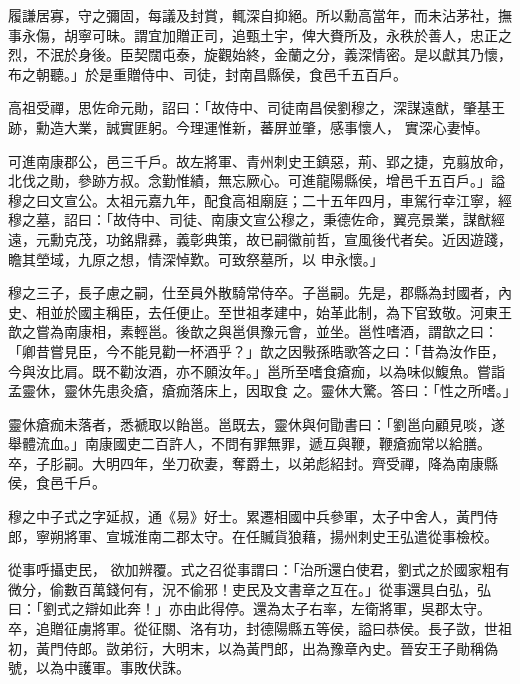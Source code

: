 \begin{pinyinscope}
 履謙居寡，守之彌固，每議及封賞，輒深自抑絕。所以勳高當年，而未沾茅社，撫事永傷，胡寧可昧。謂宜加贈正司，追甄土宇，俾大賚所及，永秩於善人，忠正之烈，不泯於身後。臣契闊屯泰，旋觀始終，金蘭之分，義深情密。是以獻其乃懷，布之朝聽。」於是重贈侍中、司徒，封南昌縣侯，食邑千五百戶。



 高祖受禪，思佐命元勛，詔曰：「故侍中、司徒南昌侯劉穆之，深謀遠猷，肇基王跡，勳造大業，誠實匪躬。今理運惟新，蕃屏並肇，感事懷人，
 實深心妻悼。



 可進南康郡公，邑三千戶。故左將軍、青州刺史王鎮惡，荊、郢之捷，克翦放命，北伐之勛，參跡方叔。念勤惟績，無忘厥心。可進龍陽縣侯，增邑千五百戶。」謚穆之曰文宣公。太祖元嘉九年，配食高祖廟庭；二十五年四月，車駕行幸江寧，經穆之墓，詔曰：「故侍中、司徒、南康文宣公穆之，秉德佐命，翼亮景業，謀猷經遠，元勳克茂，功銘鼎彞，義彰典策，故已嗣徽前哲，宣風後代者矣。近因遊踐，瞻其塋域，九原之想，情深悼歎。可致祭墓所，以
 申永懷。」



 穆之三子，長子慮之嗣，仕至員外散騎常侍卒。子邕嗣。先是，郡縣為封國者，內史、相並於國主稱臣，去任便止。至世祖孝建中，始革此制，為下官致敬。河東王歆之嘗為南康相，素輕邕。後歆之與邕俱豫元會，並坐。邕性嗜酒，謂歆之曰：「卿昔嘗見臣，今不能見勸一杯酒乎？」歆之因斅孫晧歌答之曰：「昔為汝作臣，今與汝比肩。既不勸汝酒，亦不願汝年。」邕所至嗜食瘡痂，以為味似鰒魚。嘗詣孟靈休，靈休先患灸瘡，瘡痂落床上，因取食
 之。靈休大驚。答曰：「性之所嗜。」



 靈休瘡痂未落者，悉褫取以飴邕。邕既去，靈休與何勖書曰：「劉邕向顧見啖，遂舉體流血。」南康國吏二百許人，不問有罪無罪，遞互與鞭，鞭瘡痂常以給膳。卒，子肜嗣。大明四年，坐刀砍妻，奪爵土，以弟彪紹封。齊受禪，降為南康縣侯，食邑千戶。



 穆之中子式之字延叔，通《易》好士。累遷相國中兵參軍，太子中舍人，黃門侍郎，寧朔將軍、宣城淮南二郡太守。在任贓貨狼藉，揚州刺史王弘遣從事檢校。



 從事呼攝吏民，
 欲加辨覆。式之召從事謂曰：「治所還白使君，劉式之於國家粗有微分，偷數百萬錢何有，況不偷邪！吏民及文書章之互在。」從事還具白弘，弘曰：「劉式之辯如此奔！」亦由此得停。還為太子右率，左衛將軍，吳郡太守。卒，追贈征虜將軍。從征關、洛有功，封德陽縣五等侯，謚曰恭侯。長子敳，世祖初，黃門侍郎。敳弟衍，大明末，以為黃門郎，出為豫章內史。晉安王子勛稱偽號，以為中護軍。事敗伏誅。




\end{pinyinscope}

